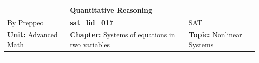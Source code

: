 \documentclass[11pt,paper=a4,answers]{exam}
\begin{document}
\begin{center}
    \centering
    \renewcommand{\arraystretch}{1.5}
    \begin{tabularx}{\textwidth}{YYY}
    & \normalsize\bf{{\Large{{Quantitative Reasoning}}}} & \\
    By Preppeo & \normalsize\bf{{sat\_lid\_017}} & SAT\\
    \normalsize{{\textbf{{Unit:}} Advanced Math}} & \normalsize{{\textbf{{Chapter:}} Systems of equations in two variables}} & \normalsize{{\textbf{{Topic:}} Nonlinear Systems}} \\
    \end{tabularx}
\end{center}
\par\noindent\rule{\textwidth}{1pt}
\end{document}

